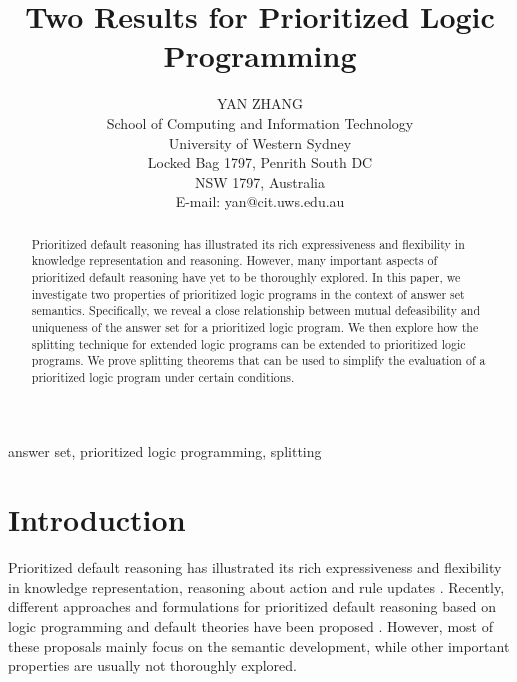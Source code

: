 \documentclass{tlp}
\begin{document}


\long{}


\title{Two Results for Prioritized Logic Programming}

\author[Y. Zhang]
{YAN ZHANG \\
School of Computing and Information Technology\\
University of Western Sydney\\
Locked Bag 1797, Penrith South DC\\ 
NSW 1797, Australia    \\
E-mail: yan@cit.uws.edu.au
}

\pagerange{\pageref{firstpage}--\pageref{lastpage}}
\setcounter{page}{1}

\maketitle

\label{firstpage}

\begin{abstract}
%
Prioritized default reasoning has illustrated its rich expressiveness and
flexibility in knowledge representation and reasoning.
However, many important aspects of 
prioritized default reasoning have yet to be thoroughly explored.
In this paper, we  
investigate two properties of 
prioritized logic programs in the context of answer set semantics.
Specifically, we reveal a close relationship between mutual defeasibility
and uniqueness of the answer set for a prioritized logic program.
We then explore how the splitting technique for 
extended logic programs can be extended to
prioritized logic programs. We prove splitting theorems
that can be used to simplify the evaluation of a prioritized logic program 
under certain conditions.


\end{abstract}
\begin{keywords}
 answer set, prioritized logic programming, splitting
\end{keywords}

\section{Introduction}

Prioritized default reasoning has illustrated its rich expressiveness and
flexibility in knowledge representation, reasoning about action and
rule updates \cite{brewka:plp,g:97,yan:plp}.
Recently, different approaches and
formulations for prioritized default reasoning based on
logic programming and default theories have been proposed
\cite{be:aij,d:plp,g:97,w:plp}. 
However, most of these proposals mainly focus on the semantic development,
while other important
properties are usually not thoroughly explored.
\end{document}
